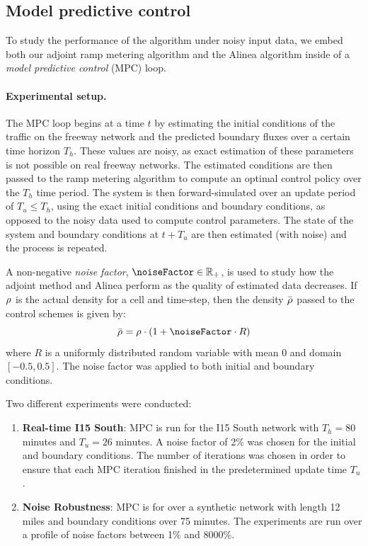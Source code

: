 								
\subsection{Model predictive control\label{sub:Model-predictive-control}}
								
To study the performance of the algorithm under noisy input data,
we embed both our adjoint ramp metering algorithm and the Alinea algorithm
inside of a \emph{model predictive control }(MPC) loop.
								
								
\paragraph{Experimental setup.}
								
The MPC loop begins at a time $t$ by estimating the initial conditions
of the traffic on the freeway network and the predicted boundary fluxes
over a certain time horizon $T_{h}$. These values are noisy, as exact
estimation of these parameters is not possible on real freeway networks.
The estimated conditions are then passed to the ramp metering algorithm
to compute an optimal control policy over the $T_{h}$ time period.
The system is then forward-simulated over an update period of $T_{u}\le T_{h}$,
using the exact initial conditions and boundary conditions, as opposed
to the noisy data used to compute control parameters. The state of
the system and boundary conditions at $t+T_{u}$ are then estimated
(with noise) and the process is repeated.
								
A non-negative\emph{ noise factor}, $\noiseFactor \in \R_+$, is used to study how the adjoint
method and Alinea perform as the quality of estimated data decreases. If $\rho_{}^{}$ is the actual density for a cell and time-step, then the density $\bar{\rho_{}^{}}$ passed to the control schemes is given by:
\[
\bar{\discrete{}{}}=\discrete{}{}\cdot \left(1+\noiseFactor\cdot R\right)
\]
where $R$ is a uniformly distributed random variable with mean $0$
and domain $\left[-0.5,0.5\right]$. The noise factor was applied
to both initial and boundary conditions.
								
Two different experiments were conducted:
\begin{enumerate}
	\item \textbf{Real-time I15 South}: MPC is run for the I15 South network
	with $T_{h}=80$ minutes and $T_{u}=26$ minutes. A noise factor of
	2\% was chosen for the initial and boundary conditions. The number
	of iterations was chosen in order to ensure that each MPC iteration
	finished in the predetermined update time $T_{u}$.
	\item \textbf{Noise Robustness}: MPC is for over a synthetic network with
	length 12 miles and boundary conditions over 75 minutes. The experiments
	are run over a profile of noise factors between 1\% and 8000\%.
\end{enumerate}
								
